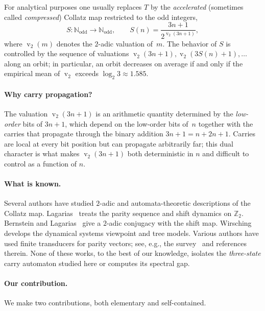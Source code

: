 \documentclass[11pt,a4paper]{article}
\theoremstyle{definition}
\theoremstyle{remark}
\DeclareMathOperator{\val}{v}
\newcommand{\N}{\mathbb{N}}
\newcommand{\Z}{\mathbb{Z}}
\newcommand{\Nodd}{\N_{\mathrm{odd}}}
\begin{document}
For analytical purposes one usually replaces $T$ by the
\emph{accelerated} (sometimes called \emph{compressed}) Collatz map
restricted to the odd integers,
\begin{equation}\label{eq:S-def}
  S \colon \Nodd \to \Nodd, \qquad
  S(n) = \frac{3n+1}{2^{\val_2(3n+1)}},
\end{equation}
where $\val_2(m)$ denotes the $2$-adic valuation of~$m$.  The behavior
of $S$ is controlled by the sequence of valuations
$\val_2(3n+1), \val_2(3 S(n) + 1), \ldots$ along an orbit; in particular,
an orbit decreases on average if and only if the empirical mean of
$\val_2$ exceeds $\log_2 3 \approx 1.585$.

\paragraph{Why carry propagation?}
The valuation $\val_2(3n+1)$ is an arithmetic quantity determined by the
\emph{low-order} bits of $3n+1$, which depend on the low-order bits
of~$n$ together with the carries that propagate through the binary
addition $3n+1 = n + 2n + 1$.  Carries are local at every bit position
but can propagate arbitrarily far; this dual character is what makes
$\val_2(3n+1)$ both deterministic in $n$ and difficult to control as a
function of $n$.

\paragraph{What is known.}
Several authors have studied $2$-adic and automata-theoretic
descriptions of the Collatz map.  Lagarias~\cite{Lagarias1985} treats
the parity sequence and shift dynamics on $\Z_2$.  Bernstein and
Lagarias~\cite{BernsteinLagarias1996} give a $2$-adic conjugacy with the
shift map.  Wirsching~\cite{Wirsching1998} develops the dynamical
systems viewpoint and tree models.  Various authors have used finite
transducers for parity vectors; see, e.g., the survey~\cite{Lagarias2010}
and references therein.  None of these works, to the best of our
knowledge, isolates the \emph{three-state} carry automaton studied here
or computes its spectral gap.

\paragraph{Our contribution.}
We make two contributions, both elementary and self-contained.
\end{document}
